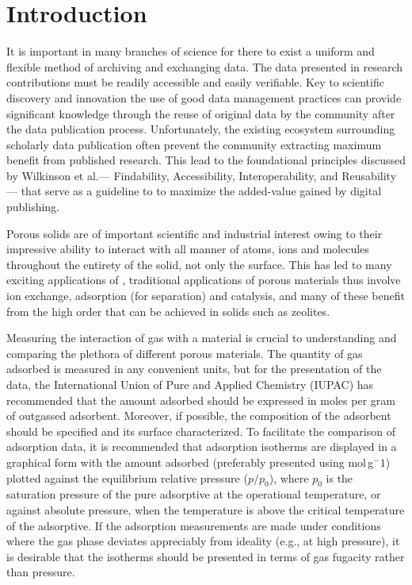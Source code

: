 \documentclass[journal=langd5,manuscript=article]{achemso}
\begin{document}
\section{Introduction}
It is important in many branches of science for there to exist a uniform and flexible method of archiving and exchanging data.
The data presented in research contributions must be readily accessible and easily verifiable.
Key to scientific discovery and innovation the use of good data management practices can  provide significant knowledge through the reuse of original data by the community after the data publication process.\cite{10.1038/sdata.2016.18}
Unfortunately, the existing ecosystem surrounding scholarly data publication often prevent the community extracting maximum benefit from published research.
This lead to the foundational principles discussed by Wilkinson et al.--- Findability, Accessibility, Interoperability, and Reusability--- that serve as a guideline to to maximize the added-value gained by digital publishing.\cite{10.1038/sdata.2016.18}

Porous solids are of important scientific and industrial interest owing to their impressive ability to interact with all manner of atoms, ions and molecules throughout the entirety of the solid, not only the surface.\cite{}
This has led to many exciting applications of , traditional applications of porous materials thus involve ion exchange, adsorption (for separation) and catalysis, and many of these benefit from the high order that can be achieved in solids such as zeolites.\cite{}

Measuring the interaction of gas with a material is crucial to understanding and comparing the plethora of different porous materials.
The quantity of gas adsorbed is measured in any convenient units, but for the presentation of the data, the International Union of Pure and Applied Chemistry (IUPAC) has recommended that the amount adsorbed should be expressed in moles per gram of outgassed adsorbent.\cite{} Moreover, if possible, the composition of the adsorbent should be specified and its surface characterized. To facilitate the comparison of adsorption data, it is recommended that adsorption isotherms are displayed in a graphical form with the amount adsorbed (preferably presented using mol$\,$g$^-1$) plotted against the equilibrium relative pressure ($p/p_0$), where $p_0$ is the saturation pressure of the pure adsorptive at the operational temperature, or against absolute pressure, when the temperature is above the critical temperature of the adsorptive. If the adsorption measurements are made under conditions where the gas phase deviates appreciably from ideality (e.g., at high pressure), it is desirable that the isotherms should be presented in terms of gas fugacity rather than pressure.
\end{document}
